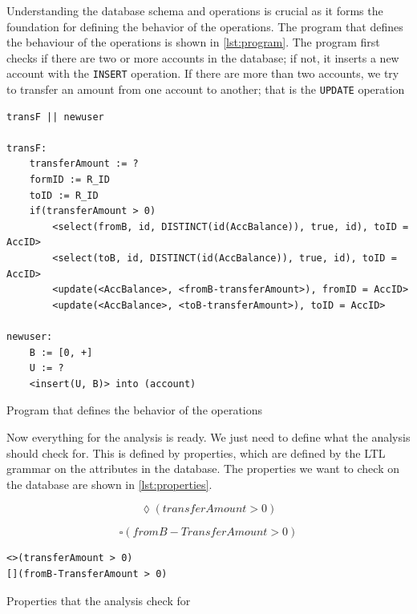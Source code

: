 Understanding the database schema and operations is crucial as it forms the foundation for defining the behavior of the operations.
The program that defines the behaviour of the operations is shown in \autoref{lst:program}.
The program first checks if there are two or more accounts in the database; if not, it inserts a new account with the \texttt{INSERT} operation.
If there are more than two accounts, we try to transfer an amount from one account to another; that is the \texttt{UPDATE} operation


\begin{listing}[htb!]
    \begin{verbatim}
transF || newuser

transF:
    transferAmount := ?
    formID := R_ID
    toID := R_ID
    if(transferAmount > 0)
        <select(fromB, id, DISTINCT(id(AccBalance)), true, id), toID = AccID>
        <select(toB, id, DISTINCT(id(AccBalance)), true, id), toID = AccID>
        <update(<AccBalance>, <fromB-transferAmount>), fromID = AccID>
        <update(<AccBalance>, <toB-transferAmount>), toID = AccID>

newuser:
    B := [0, +]
    U := ?
    <insert(U, B)> into (account)
    \end{verbatim}
    \caption{Program that defines the behavior of the operations}
    \label{lst:program}
\end{listing}


Now everything for the analysis is ready.
We just need to define what the analysis should check for.
This is defined by properties, which are defined by the LTL grammar on the attributes in the database.
The properties we want to check on the database are shown in \autoref{lst:properties}.

\begin{equation}
    \lozenge (transferAmount > 0)
    \label{eq:ltl-eventual-property}
\end{equation}


\begin{equation}
    \square (fromB-TransferAmount > 0)
    \label{eq:ltl-always-property}
\end{equation}


\begin{listing}[htb!]
    \begin{verbatim}
<>(transferAmount > 0)
[](fromB-TransferAmount > 0)
    \end{verbatim}
    \caption{Properties that the analysis check for}
    \label{lst:properties}
\end{listing}


